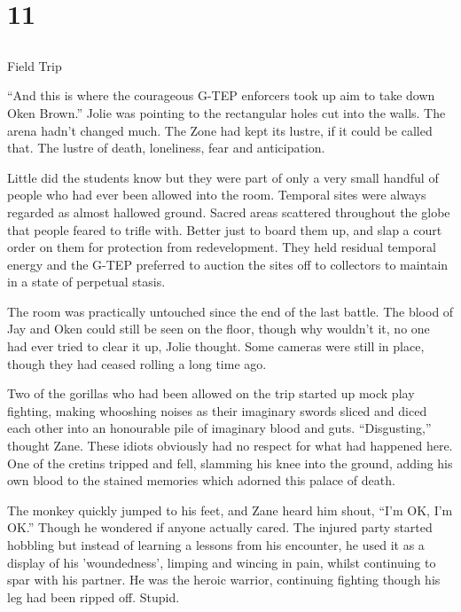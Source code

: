 \chapter{11}
\section{}
Field Trip  

``And this is where the courageous G-TEP enforcers took up aim to take down Oken Brown.''  Jolie was pointing to the rectangular holes cut into the walls.  The arena hadn't changed much.  The Zone had kept its lustre, if it could be called that.  The lustre of death, loneliness, fear and anticipation.  

Little did the students know but they were part of only a very small handful of people who had ever been allowed into the room.  Temporal sites were always regarded as almost hallowed ground.  Sacred areas scattered throughout the globe that people feared to trifle with.  Better just to board them up, and slap a court order on them for protection from redevelopment.  They held residual temporal energy and the G-TEP preferred to auction the sites off to collectors to maintain in a state of perpetual stasis.

The room was practically untouched since the end of the last battle.  The blood of Jay and Oken could still be seen on the floor, though why wouldn't it, no one had ever tried to clear it up, Jolie thought.  Some cameras were still in place, though they had ceased rolling a long time ago.

Two of the gorillas who had been allowed on the trip started up mock play fighting, making whooshing noises as their imaginary swords sliced and diced each other into an honourable pile of imaginary blood and guts.  ``Disgusting,'' thought Zane.  These idiots obviously had no respect for what had happened here.  One of the cretins tripped and fell, slamming his knee into the ground, adding his own blood to the stained memories which adorned this palace of death.  

The monkey quickly jumped to his feet, and Zane heard him shout, ``I'm OK, I'm OK.''  Though he wondered if anyone actually cared.  The injured party started hobbling but instead of learning a lessons from his encounter, he used it as a display of his 'woundedness', limping and wincing in pain, whilst continuing to spar with his partner.  He was the heroic warrior, continuing fighting though his leg had been ripped off.  Stupid.

